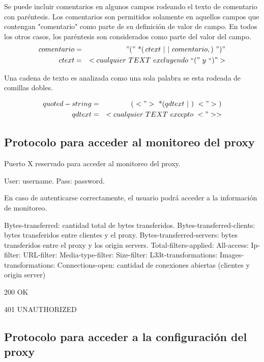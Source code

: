 \documentclass[a4paper,10pt]{article}
\begin{document}
        Se puede incluir comentarios en algunos campos rodeando el texto de comentario con par\'entesis. Los comentarios son permitidos solamente en aquellos campos 
        que contengan "comentario" como parte de su definici\'on de valor de campo. En todos los otros casos, los par\'entesis son considerados como parte del valor del campo.
        \begin{eqnarray*}
            comentario       & = & "("\,\,\text{*}(\,ctext\,\,|\,\,|\,\,comentario,)\,\,")"\nonumber\\
            ctext         & = & <cualquier\,\,TEXT\,\,excluyendo\,\,``("\,\,y\,\,``)">\nonumber\\
        \end{eqnarray*}



        Una cadena de texto es analizada como una sola palabra se esta rodeada de comillas dobles.

        \begin{eqnarray*}
            quoted-string & = & (\,\,<">\,\,\text{*}(qdtext\,\,|\,\,)\,\,<">\,\,)\nonumber\\
            qdtext        & = & <cualquier\,\,TEXT\,\,excepto\,\,<">>\nonumber\\
        \end{eqnarray*}

\newpage
\subsection{Protocolo para acceder al monitoreo del proxy}

Puerto X reservado para acceder al monitoreo del proxy.

User: username.
Pass: password.

En caso de autenticarse correctamente, el usuario podr\'a acceder a la información de monitoreo.

Bytes-transferred: cantidad total de bytes transferidos.
Bytes-transferred-clients: bytes transferidos entre clientes y el proxy.
Bytes-transferred-servers: bytes transferidos entre el proxy y los origin servers.
Total-filters-applied:
All-access:
Ip-filter:
URL-filter:
Media-type-filter:
Size-filter:
L33t-transformations:
Images-transformations:
Connections-open: cantidad de conexiones abiertas (clientes y origin server)


200 OK

401 UNAUTHORIZED

\newpage
    \subsection{Protocolo para acceder a la configuración del proxy}
\end{document}
